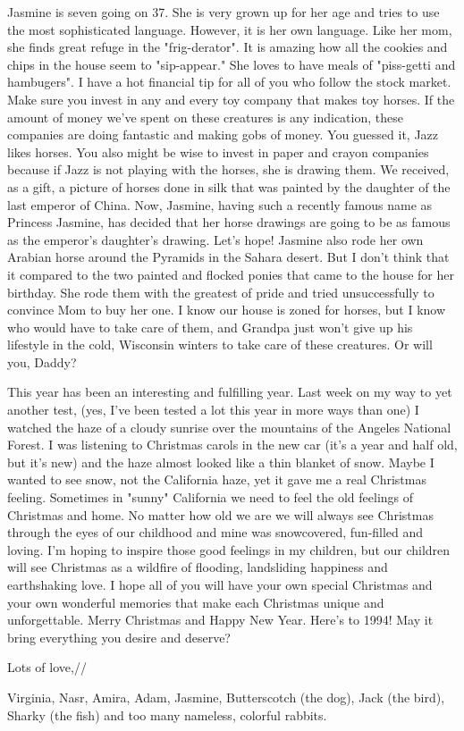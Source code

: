 Jasmine is seven going on 37. She is very grown up for her age and tries to use the most sophisticated language. However, it is her own
language. Like her mom, she finds great refuge in the "frig-derator". It is amazing how all the cookies and chips in the house seem to
"sip-appear." She loves to have meals of "piss-getti and hambugers". I have a hot financial tip for all of you who follow the stock market. Make
sure you invest in any and every toy company that makes toy horses. If the amount of money we've spent on these creatures is any indication,
these companies are doing fantastic and making gobs of money. You guessed it, Jazz likes horses. You also might be wise to invest in paper and
crayon companies because if Jazz is not playing with the horses, she is drawing them. We received, as a gift, a picture of horses done in silk
that was painted by the daughter of the last emperor of China. Now, Jasmine, having such a recently famous name as Princess Jasmine, has decided
that her horse drawings are going to be as famous as the emperor's daughter's drawing. Let's hope! Jasmine also rode her own Arabian horse
around the Pyramids in the Sahara desert. But I don't think that it compared to the two painted and flocked ponies that came to the house for
her birthday. She rode them with the greatest of pride and tried unsuccessfully to convince Mom to buy her one. I know our house is zoned for
horses, but I know who would have to take care of them, and Grandpa just won't give up his lifestyle in the cold, Wisconsin winters to take care
of these creatures. Or will you, Daddy?

This year has been an interesting and fulfilling year. Last week on my way to yet another test, (yes, I've been tested a lot this year in more
ways than one) I watched the haze of a cloudy sunrise over the mountains of the Angeles National Forest. I was listening to Christmas carols in
the new car (it's a year and half old, but it's new) and the haze almost looked like a thin blanket of snow. Maybe I wanted to see snow, not the
California haze, yet it gave me a real Christmas feeling. Sometimes in "sunny" California we need to feel the old feelings of Christmas and
home. No matter how old we are we will always see Christmas through the eyes of our childhood and mine was snowcovered, fun-filled and loving.
I'm hoping to inspire those good feelings in my children, but our children will see Christmas as a wildfire of flooding, landsliding happiness
and earthshaking love. I hope all of you will have your own special Christmas and your own wonderful memories that make each Christmas unique
and unforgettable. Merry Christmas and Happy New Year. Here's to 1994! May it bring everything you desire and deserve?

Lots of love,//

Virginia, Nasr, Amira, Adam, Jasmine, Butterscotch (the dog), Jack (the bird), Sharky (the fish) and too many nameless, colorful rabbits.


%
